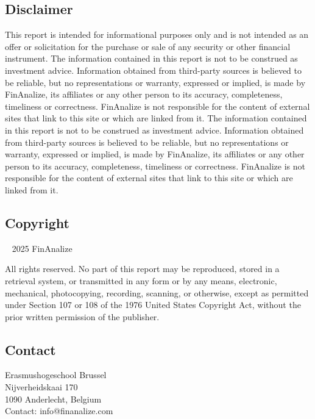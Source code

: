 

\thispagestyle{empty} %

\begin{twothirdswidth} %
    \footnotesize %

    \subsection*{Disclaimer}

    This report is intended for informational purposes only and is not intended as an offer or solicitation for the purchase or sale of any security or other financial instrument. The information contained in this report is not to be construed as investment advice. Information obtained from third-party sources is believed to be reliable, but no representations or warranty, expressed or implied, is made by FinAnalize, its affiliates or any other person to its accuracy, completeness, timeliness or correctness. FinAnalize is not responsible for the content of external sites that link to this site or which are linked from it. The information contained in this report is not to be construed as investment advice. Information obtained from third-party sources is believed to be reliable, but no representations or warranty, expressed or implied, is made by FinAnalize, its affiliates or any other person to its accuracy, completeness, timeliness or correctness. FinAnalize is not responsible for the content of external sites that link to this site or which are linked from it.
    \subsection*{Copyright}

    \textcopyright~ 2025 FinAnalize

    All rights reserved. No part of this report may be reproduced, stored in a retrieval system, or transmitted in any form or by any means, electronic, mechanical, photocopying, recording, scanning, or otherwise, except as permitted under Section 107 or 108 of the 1976 United States Copyright Act, without the prior written permission of the publisher.

    \subsection*{Contact}

    Erasmushogeschool Brussel\\
    Nijverheidskaai 170\\
    1090 Anderlecht, Belgium\\

    Contact: info@finanalize.com

\end{twothirdswidth}

